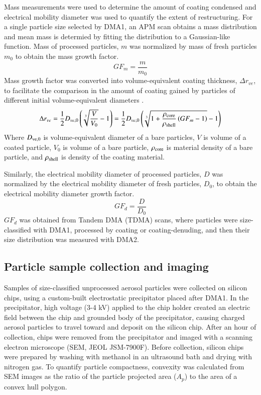 Mass measurements were used to determine the amount of coating condensed and electrical mobility diameter was used to quantify the extent of restructuring. For a single particle size selected by DMA1, an APM scan obtains a mass distribution and mean mass is determied by fitting the distribution to a Gaussian-like function. Mass of processed particles, $m$ was normalized by mass of fresh particles $m_0$ to obtain the mass growth factor.
\begin{equation}
GF_m=\frac{m}{m_0}
\label{eq:gfm}
\end{equation}
Mass growth factor was converted into volume-equivalent coating thickness, $\Delta r_{ve}$, to facilitate the comparison in the amount of coating gained by particles of different initial volume-equivalent diameters \citep{RN37}.
\begin{equation}
\Delta r_{ve}=\frac{1}{2}D_{ve,0}\left(\sqrt[3]{\frac{V}{V_0}}-1\right)=
\frac{1}{2}D_{ve,0}\left(\sqrt[3]{1+\frac{\rho_{\rm core}}{\rho_{\rm shell}}\left(GF_m-1\right)}-1\right)
\label{eq:drve}
\end{equation}
Where $D_{\rm ve,0}$ is volume-equivalent diameter of a bare particles, $V$ is volume of a coated particle, $V_0$ is volume of a bare particle, $\rho_{\rm core}$ is material density of a bare particle, and $\rho_{\rm shell}$ is density of the coating material.

Similarly, the electrical mobility diameter of processed particles, $D$ was normalized by the electrical mobility diameter of fresh particles, $D_0$, to obtain the electrical mobility diameter growth factor.
\begin{equation}
GF_d=\frac{D}{D_0}
\label{eq:gfd}
\end{equation}
$GF_{d}$ was obtained from Tandem DMA (TDMA) scans, where particles were size-classified with DMA1, processed by coating or coating-denuding, and then their size distribution was measured with DMA2.

\subsection{Particle sample collection and imaging}

Samples of size-classified unprocessed aerosol particles were collected on silicon chips, using a custom-built electrostatic precipitator \citep{RN17,RN16} placed after DMA1. In the precipitator, high voltage (3-4 kV) applied to the chip holder created an electric field between the chip and grounded body of the precipitator, causing charged aerosol particles to travel toward and deposit on the silicon chip. After an hour of collection, chips were removed from the precipitator and imaged with a scanning electron microscope (SEM, JEOL JSM-7900F). Before collection, silicon chips were prepared by washing with methanol in an ultrasound bath and drying with nitrogen gas. To quantify particle compactness, convexity was calculated from SEM images as the ratio of the particle projected area ($A_p$) to the area of a convex hull polygon.

